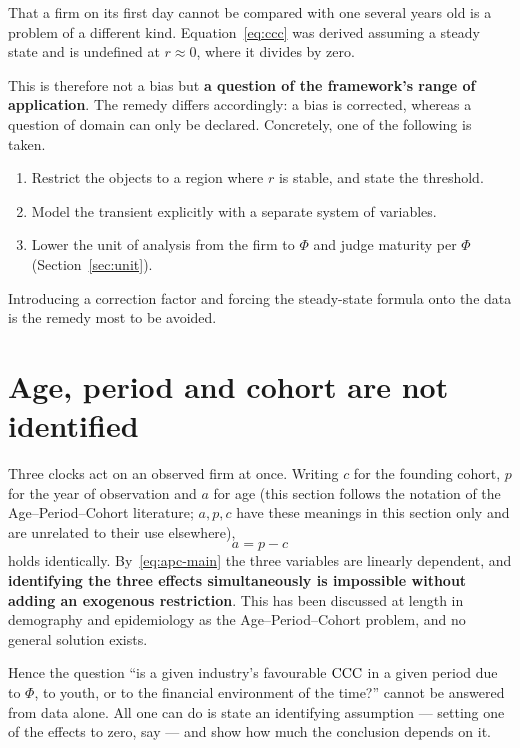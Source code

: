 That a firm on its first day cannot be compared with one several years old is a problem of a
different kind. Equation~\eqref{eq:ccc} was derived assuming a steady state and is undefined
at $r\approx 0$, where it divides by zero.

This is therefore not a bias but \textbf{a question of the framework's range of application}.
The remedy differs accordingly: a bias is corrected, whereas a question of domain can only be
declared. Concretely, one of the following is taken.

\begin{enumerate}[label=(\arabic*)]
\item Restrict the objects to a region where $r$ is stable, and state the threshold.
\item Model the transient explicitly with a separate system of variables.
\item Lower the unit of analysis from the firm to $\Phi$ and judge maturity per $\Phi$ (Section~\ref{sec:unit}).
\end{enumerate}

Introducing a correction factor and forcing the steady-state formula onto the data is the
remedy most to be avoided.

\section{Age, period and cohort are not identified}
\label{sec:apc}

Three clocks act on an observed firm at once. Writing $c$ for the founding cohort, $p$ for
the year of observation and $a$ for age (this section follows the notation of the
Age--Period--Cohort literature; $a,p,c$ have these meanings in this section only and are
unrelated to their use elsewhere),
\begin{equation}
a = p - c
\label{eq:apc-main}
\end{equation}
holds identically. By~\eqref{eq:apc-main} the three variables are linearly dependent, and
\textbf{identifying the three effects simultaneously is impossible without adding an
exogenous restriction}. This has been discussed at length in demography and epidemiology as
the Age--Period--Cohort problem, and no general solution exists.

Hence the question ``is a given industry's favourable $\mathrm{CCC}$ in a given period due to
$\Phi$, to youth, or to the financial environment of the time?'' cannot be answered from data
alone. All one can do is state an identifying assumption --- setting one of the effects to
zero, say --- and show how much the conclusion depends on it.

